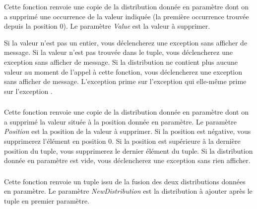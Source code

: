 \noindent Cette fonction renvoie une copie de la distribution donnée en paramètre dont on a supprimé une occurrence de la valeur indiquée (la première occurrence trouvée depuis la position $ 0 $).
Le paramètre \textit{Value} est la valeur à supprimer.

\noindent Si la valeur n'est pas un entier, vous déclencherez une exception  sans afficher de message.
Si la valeur n'est pas trouvée dans le tuple, vous déclencherez une exception  sans afficher de message.
Si la distribution ne contient plus aucune valeur au moment de l'appel à cette fonction, vous déclencherez une exception  sans afficher de message.
L'exception  prime sur l'exception  qui elle-même prime sur l'exception .


\subsubsection*{}

\noindent Cette fonction renvoie une copie de la distribution donnée en paramètre dont on a supprimé la valeur située à la position donnée en paramètre.
Le paramètre \textit{Position} est la position de la valeur à supprimer.
Si la position est négative, vous supprimerez l'élément en position $ 0 $.
Si la position est supérieure à la dernière position du tuple, vous supprimerez le dernier élément du tuple.
Si la distribution donnée en paramètre est vide, vous déclencherez une exception  sans rien afficher.


\subsubsection*{}

\noindent Cette fonction renvoie un tuple issu de la fusion des deux distributions données en paramètre.
Le paramètre \textit{NewDistribution} est la distribution à ajouter après le tuple en premier paramètre.


